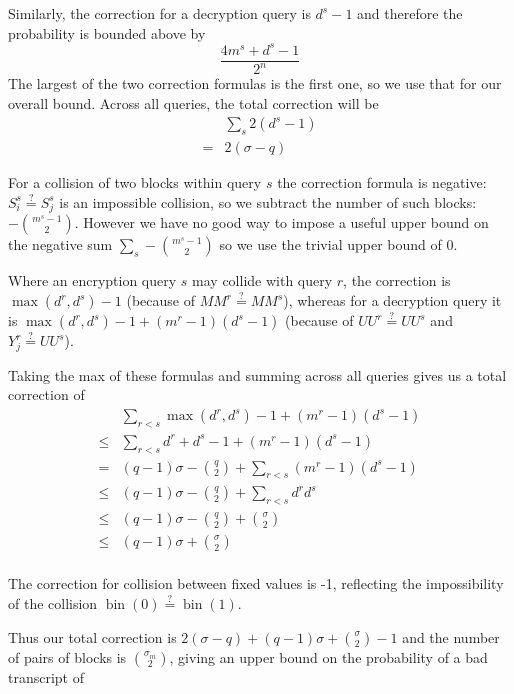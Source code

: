 \documentclass[letterpaper,11pt]{article}
\newcommand*{\MM}{\mathit{MM}}
\newcommand*{\qeq}{\stackrel{\text{?}}{=}}
\newcommand*{\UU}{\mathit{UU}}
\DeclareMathOperator{\fromint}{bin}
\begin{document}
Similarly, the correction for a decryption query is
\(d^s - 1\) and therefore  the probability 
is bounded above by
\begin{displaymath}
    \frac{4m^s + d^s -1}{2^n}
\end{displaymath}
The largest of the two correction formulas is
the first one, so we use that for our overall bound.
Across all queries, the total
correction will be
\begin{align*}
    &\sum_s 2(d^s - 1) \\
    = & 2(\sigma - q)
\end{align*}

For a collision of two blocks within query \(s\)
the correction formula is negative:
\(S_i^s \qeq S_j^s\) is an impossible collision, 
so we subtract the number of such blocks:
\(-\binom{m^s -1}{2}\). However we have no good way
to impose a useful upper bound on the negative sum
\(\sum_s-\binom{m^s -1}{2}\) so we use the
trivial upper bound of 0.

Where an encryption query \(s\)
may collide with query \(r\), the correction is 
\(\max(d^r, d^s) -1\)
(because of \(\MM^r \qeq \MM^s\)), whereas for a decryption query
it is \(\max(d^r, d^s) -1 + (m^r -1 )(d^s -1)\)
(because of \(\UU^r \qeq \UU^s\) and \(Y_j^r \qeq \UU^s\)).

Taking the max of these formulas and summing across
all queries gives us a total correction of
\begin{align*}
    &\sum_{r < s} \max(d^r, d^s) -1 + (m^r -1 )(d^s -1)\\
    \leq & \sum_{r < s} d^r + d^s -1 + (m^r -1 )(d^s -1)\\
    = & (q-1)\sigma - \binom{q}{2} + \sum_{r < s} (m^r -1 )(d^s -1) \\
    \leq & (q-1)\sigma - \binom{q}{2} + \sum_{r < s} d^rd^s \\
    \leq & (q-1)\sigma - \binom{q}{2} + \binom{\sigma}{2} \\
   \leq & (q-1)\sigma + \binom{\sigma}{2} \\
\end{align*}

The correction for collision between fixed values
is -1, reflecting the impossibility of the collision
\(\fromint(0) \qeq \fromint(1)\).

Thus our total correction is
\(2(\sigma - q) + (q-1)\sigma + \binom{\sigma}{2} -1\)
and the number of pairs of blocks is \(\binom{\sigma_m}{2}\), 
giving an upper bound
on the probability of a bad transcript of
\end{document}
